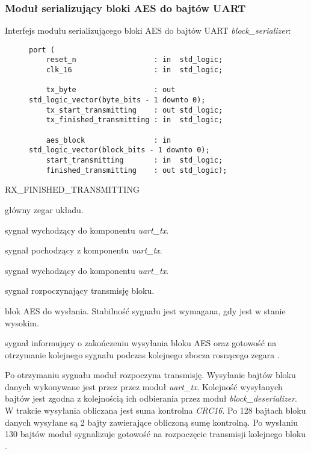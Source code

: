 \subsubsection{Moduł serializujący bloki AES do bajtów UART}
Interfejs modułu serializującego bloki AES do bajtów UART \textit{block\_serializer}:

\begin{figure}[!h]
\begin{lstlisting}[style=vhdl]
port (
	reset_n                  : in  std_logic;
	clk_16                   : in  std_logic;

	tx_byte                  : out std_logic_vector(byte_bits - 1 downto 0);
	tx_start_transmitting    : out std_logic;
	tx_finished_transmitting : in  std_logic;

	aes_block                : in  std_logic_vector(block_bits - 1 downto 0);
	start_transmitting       : in  std_logic;
	finished_transmitting    : out std_logic);
\end{lstlisting}
\end{figure}

\begin{interface}{RX\_FINISHED\_TRANSMITTING}
	\item[\insignal{CLK\_16}] główny zegar układu.

	\item[\insignal{TX\_BYTE[7:0]}] sygnał wychodzący do komponentu \textit{uart\_tx}.
	\item[\outsignal{TX\_START\_TRANSMITTING}] sygnał pochodzący z komponentu \textit{uart\_tx}.
	\item[\insignal{TX\_FINISHED\_TRANSMITTING}] sygnał wychodzący do komponentu \textit{uart\_tx}.

	\item[\insignal{START\_TRANSMITTING}] sygnał rozpoczynający transmisję bloku.
	\item[\insignal{AES\_BLOCK[127:0]}] blok AES do wysłania. Stabilność sygnału jest wymagana, gdy  jest w stanie wysokim.
	\item[\outsignal{FINISHED\_TRANSMITTING}] sygnał informujący o zakończeniu wysyłania bloku AES oraz gotowość na otrzymanie kolejnego sygnału  podczas kolejnego zbocza rosnącego zegara .
\end{interface}

Po otrzymaniu sygnału  moduł rozpoczyna transmisję. Wysyłanie bajtów bloku danych wykonywane jest przez przez moduł \textit{uart\_tx}. Kolejność wysyłanych bajtów jest zgodna z kolejnością ich odbierania przez moduł \textit{block\_deserializer}. W trakcie wysyłania obliczana jest suma kontrolna \textit{CRC16}. Po 128 bajtach bloku danych wysyłane są 2 bajty zawierające obliczoną sumę kontrolną. Po wysłaniu 130 bajtów moduł sygnalizuje gotowość na rozpoczęcie transmisji kolejnego bloku .

